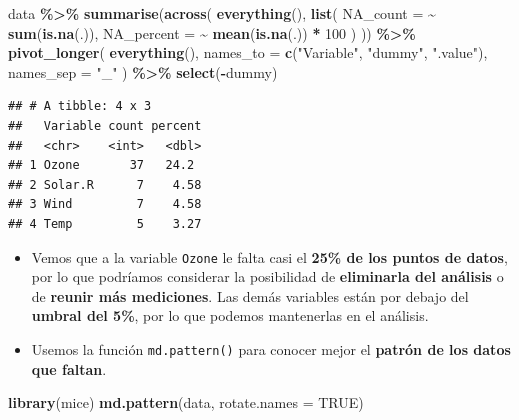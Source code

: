\documentclass[
]{book}
\newenvironment{Shaded}{\begin{snugshade}}{\end{snugshade}}
\newcommand{\AttributeTok}[1]{\textcolor[rgb]{0.13,0.29,0.53}{#1}}
\newcommand{\ConstantTok}[1]{\textcolor[rgb]{0.56,0.35,0.01}{#1}}
\newcommand{\DecValTok}[1]{\textcolor[rgb]{0.00,0.00,0.81}{#1}}
\newcommand{\FunctionTok}[1]{\textcolor[rgb]{0.13,0.29,0.53}{\textbf{#1}}}
\newcommand{\NormalTok}[1]{#1}
\newcommand{\SpecialCharTok}[1]{\textcolor[rgb]{0.81,0.36,0.00}{\textbf{#1}}}
\newcommand{\StringTok}[1]{\textcolor[rgb]{0.31,0.60,0.02}{#1}}
\begin{document}
\begin{Shaded}
\begin{Highlighting}[]
\NormalTok{data }\SpecialCharTok{\%\textgreater{}\%}
  \FunctionTok{summarise}\NormalTok{(}\FunctionTok{across}\NormalTok{(}
    \FunctionTok{everything}\NormalTok{(),}
    \FunctionTok{list}\NormalTok{(}
      \AttributeTok{NA\_count   =} \SpecialCharTok{\textasciitilde{}} \FunctionTok{sum}\NormalTok{(}\FunctionTok{is.na}\NormalTok{(.)),}
      \AttributeTok{NA\_percent =} \SpecialCharTok{\textasciitilde{}} \FunctionTok{mean}\NormalTok{(}\FunctionTok{is.na}\NormalTok{(.)) }\SpecialCharTok{*} \DecValTok{100}
\NormalTok{    )}
\NormalTok{  )) }\SpecialCharTok{\%\textgreater{}\%}
  \FunctionTok{pivot\_longer}\NormalTok{(}
    \FunctionTok{everything}\NormalTok{(),}
    \AttributeTok{names\_to =} \FunctionTok{c}\NormalTok{(}\StringTok{"Variable"}\NormalTok{, }\StringTok{"dummy"}\NormalTok{, }\StringTok{".value"}\NormalTok{),}
    \AttributeTok{names\_sep =} \StringTok{"\_"}
\NormalTok{  ) }\SpecialCharTok{\%\textgreater{}\%}
  \FunctionTok{select}\NormalTok{(}\SpecialCharTok{{-}}\NormalTok{dummy)   }
\end{Highlighting}
\end{Shaded}

\begin{verbatim}
## # A tibble: 4 x 3
##   Variable count percent
##   <chr>    <int>   <dbl>
## 1 Ozone       37   24.2 
## 2 Solar.R      7    4.58
## 3 Wind         7    4.58
## 4 Temp         5    3.27
\end{verbatim}

\begin{itemize}
\item
  Vemos que a la variable \texttt{Ozone} le falta casi el \textbf{25\% de los puntos de datos}, por lo que podríamos considerar la posibilidad de \textbf{eliminarla del análisis} o de \textbf{reunir más mediciones}. Las demás variables están por debajo del \textbf{umbral del 5\%}, por lo que podemos mantenerlas en el análisis.
\item
  Usemos la función \texttt{md.pattern()} para conocer mejor el \textbf{patrón de los datos que faltan}.
\end{itemize}

\begin{Shaded}
\begin{Highlighting}[]
\FunctionTok{library}\NormalTok{(mice)}
\FunctionTok{md.pattern}\NormalTok{(data, }\AttributeTok{rotate.names =} \ConstantTok{TRUE}\NormalTok{)}
\end{Highlighting}
\end{Shaded}
\end{document}
